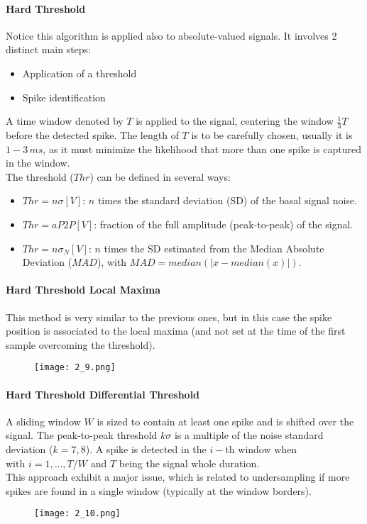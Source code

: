 \paragraph{Hard Threshold} Notice this algorithm is applied also to absolute-valued signals. It involves 2 distinct main steps:
\begin{itemize}
    \item Application of a threshold
    \item Spike identification
\end{itemize}
A time window denoted by \(T\) is applied to the signal, centering the window \(\frac{1}{3}T\) before the detected spike. The length of \(T\) is to be
carefully chosen, usually it is \(1-3\,ms\), as it must minimize the likelihood that more than one spike is captured in the window.\\
The threshold (\(Thr\)) can be defined in several ways:
\begin{itemize}
    \item \(Thr=n\sigma[V]\): \(n\) times the standard deviation (SD) of the basal signal noise.
    \item \(Thr=aP2P[V]\): fraction of the full amplitude (peak-to-peak) of the signal.
    \item \(Thr=n\sigma_N[V]\): \(n\) times the SD estimated from the Median Absolute Deviation (\(MAD\)), with \(MAD=median(|x-median(x)|)\).
\end{itemize}
\paragraph{Hard Threshold Local Maxima}
This method is very similar to the previous ones, but in this case the spike position is
associated to the local maxima (and not set at the time of the first sample overcoming the threshold).
\begin{figure}[H]
    \centering
    \texttt{[image: 2\_9.png]}
\end{figure}
\paragraph{Hard Threshold Differential Threshold}
A sliding window \(W\) is sized to contain at least one spike and is shifted over the signal. The peak-to-peak threshold \(k\sigma\) is a multiple of the noise standard deviation (\(k=7,8\)). A spike is detected in the \(i-\)th window when
\begin{equation*}
    [(max_i-min_i)\ge{k\sigma}]
\end{equation*}
with \(i=1,...,T/W\) and \(T\) being the signal whole duration.\\
This approach exhibit a major issue, which is related to undersampling if more spikes are found in a single window (typically at the window borders).
\begin{figure}[H]
    \centering
    \texttt{[image: 2\_10.png]}
\end{figure}
